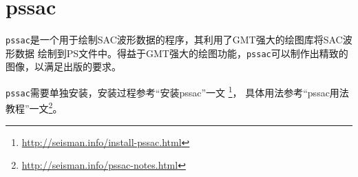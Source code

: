 \section{pssac}
\label{sec:pssac}

\verb+pssac+是一个用于绘制SAC波形数据的程序，其利用了GMT强大的绘图库将SAC波形数据
绘制到PS文件中。得益于GMT强大的绘图功能，\verb+pssac+可以制作出精致的图像，以满足出版的要求。

\verb+pssac+需要单独安装，安装过程参考``安装pssac''一文
\footnote{\url{http://seisman.info/install-pssac.html}}，
具体用法参考``pssac用法教程''一文\footnote{\url{http://seisman.info/pssac-notes.html}}。
